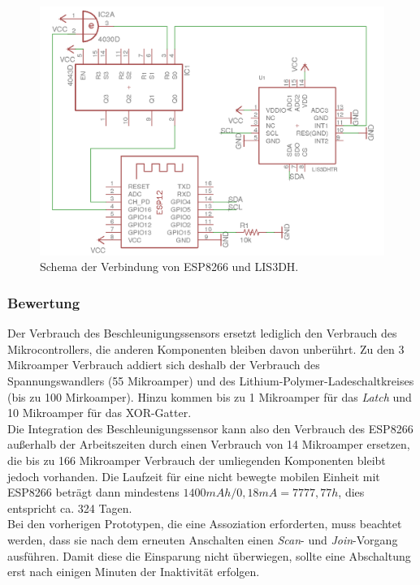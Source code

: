 \begin{figure}[h]
  \centering
	\includegraphics[width=\textwidth]{images/schematics.png}
  \caption{Schema der Verbindung von ESP8266 und LIS3DH.}
  \label{fig:schematics}
\end{figure}

\subsubsection{Bewertung}
Der Verbrauch des Beschleunigungssensors ersetzt lediglich den Verbrauch des Mikrocontrollers, die anderen Komponenten bleiben davon unberührt.
Zu den 3 Mikroamper Verbrauch addiert sich deshalb der Verbrauch des Spannungswandlers (55 Mikroamper) und des Lithium-Polymer-Ladeschaltkreises (bis zu 100 Mirkoamper).
Hinzu kommen bis zu 1 Mikroamper für das \emph{Latch} und 10 Mikroamper für das XOR-Gatter.\\
Die Integration des Beschleunigungssensor kann also den Verbrauch des ESP8266 außerhalb der Arbeitszeiten durch einen Verbrauch von 14 Mikroamper ersetzen, die bis zu 166 Mikroamper Verbrauch der umliegenden Komponenten bleibt jedoch vorhanden.
Die Laufzeit für eine nicht bewegte mobilen Einheit mit ESP8266 beträgt dann mindestens $1400mAh / 0,18mA = 7777,77h$, dies entspricht ca. 324 Tagen.\\
Bei den vorherigen Prototypen, die eine Assoziation erforderten, muss beachtet werden, dass sie nach dem erneuten Anschalten einen \emph{Scan}- und \emph{Join}-Vorgang ausführen.
Damit diese die Einsparung nicht überwiegen, sollte eine Abschaltung erst nach einigen Minuten der Inaktivität erfolgen.


